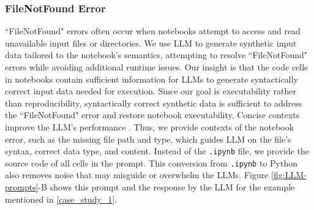 
        \subsubsection{FileNotFound Error}
            ``FileNotFound" errors often occur when notebooks attempt to access and read unavailable input files or directories. We use LLM to generate synthetic input data tailored to the notebook's semantics, attempting to resolve ``FileNotFound" errors while avoiding additional runtime issues. Our insight is that the code cells in notebooks contain sufficient information for LLMs to generate syntactically correct input data needed for execution. Since our goal is executability rather than reproducibility, syntactically correct synthetic data is sufficient to address the ``FileNotFound" error and restore notebook executability.
            Concise contexts improve the LLM's performance \cite{Ramlochan2024}. Thus, we provide contexts of the notebook error, such as the missing file path and type, which guides LLM on the file's syntax, correct data type, and content. Instead of the {\small{\texttt{.ipynb}}} file, we provide the source code of all cells in the prompt. This conversion from {\small{\texttt{.ipynb}}} to Python also removes noise that may misguide or overwhelm the LLMs. Figure \ref{fig:LLM-prompts}-B shows this prompt and the response by the LLM for the example mentioned in \ref{case_study_1}. 




